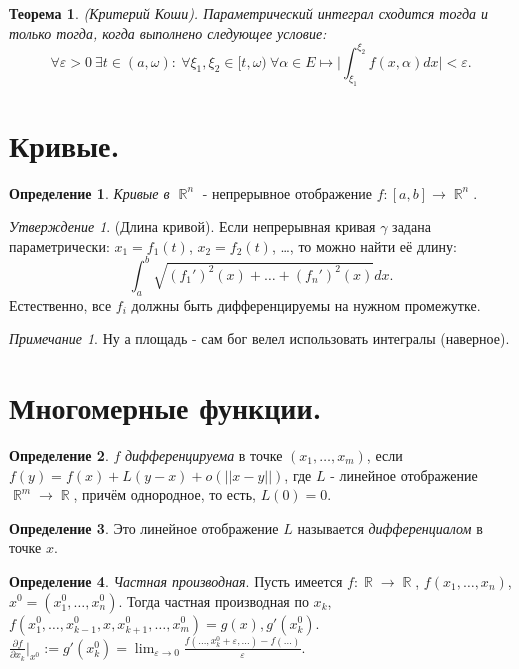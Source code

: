 \documentclass[a4paper,100pt]{article}
\theoremstyle{indented}
\newtheorem{theorem}{Теорема}
\theoremstyle{definition}
\newtheorem{defn}{Определение}
\theoremstyle{remark}
\newtheorem{remark}{Примечание}
\newtheorem{stat}{Утверждение}
\DeclareMathOperator{\RR}{\mathbb{R}}
\begin{document}
\begin{theorem}
    (Критерий Коши). Параметрический интеграл сходится тогда и только тогда, когда выполнено следующее условие:
    \[
        \forall \varepsilon >0 \: \exists t\in (a, \omega): \: \forall \xi_1, \xi_2 \in [t, \omega) \: \forall \alpha \in E \mapsto \bigg| \int_{\xi_1}^{\xi_2} f(x, \alpha)dx\bigg|<\varepsilon.
    \]
\end{theorem}

\section{Кривые.}

\begin{defn}
    \textit{Кривые в $\RR^n$} - непрерывное отображение $f:[a, b]\rightarrow \RR^n$.
\end{defn}

\begin{stat}
    (Длина кривой). Если непрерывная кривая $\gamma$ задана параметрически: $x_1=f_1(t)$, $x_2=f_2(t)$, \dots, то можно найти её длину:
    \[
        \int_a^b\sqrt{(f_1')^2(x)+\ldots+(f_n')^2(x)}dx. 
    \]
    Естественно, все $f_i$ должны быть дифференцируемы на нужном промежутке.
\end{stat}

\begin{remark}
    Ну а площадь - сам бог велел использовать интегралы (наверное).
\end{remark}

\section{Многомерные функции.}

\begin{defn}
    $f$ \textit{дифференцируема} в точке $(x_1, \ldots, x_m)$, если $f(y)=f(x)+L(y-x)+o(||x-y||)$, где $L$ - линейное отображение $\RR^m\rightarrow \RR$, причём однородное, то есть, $L(0)=0$.
\end{defn}

\begin{defn}
    Это линейное отображение $L$ называется \textit{дифференциалом} в точке $x$.
\end{defn}

\begin{defn}
    \textit{Частная производная}. Пусть имеется $f:\RR\rightarrow \RR$, $f(x_1, \ldots, x_n)$, $x^0=(x_1^0, \ldots, x_n^0)$. Тогда частная производная по $x_k $, $f(x_1^0, \ldots, x_{k-1}^0, x, x_{k+1}^0, \ldots, x_m^0)=g(x), g'(x_k^0)$. $\frac{\partial f}{\partial x_k}\bigg|_{x^0}:=g'(x_k^0)=\lim_{\varepsilon\rightarrow 0}\frac{f(\ldots, x_k^0+\varepsilon, \ldots)-f(\ldots)}{\varepsilon}$. 
\end{defn}
\end{document}
